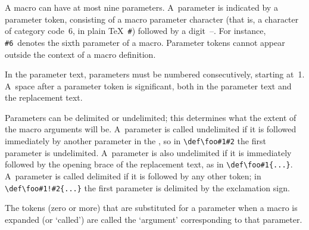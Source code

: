 A macro can have at most nine parameters. 
A~parameter is indicated by a parameter token,
consisting of a macro parameter character
(that is, a character of category code~6,
in plain \TeX~\verb=#=) 
followed by a digit~--. 
For instance, \verb>#6>~denotes the sixth parameter of a macro.
Parameter tokens cannot appear outside the context
of a macro definition.

In the parameter text,
parameters must be numbered consecutively, starting at~1.
A~space after a parameter token is significant,
both in the parameter text and the replacement text.

Parameters can be delimited or undelimited; this determines what the
extent of the macro arguments will be. A~parameter
is called undelimited if it is followed immediately
by another parameter in the , so in
\verb+\def\foo#1#2+ the first parameter is undelimited.
A~parameter is also undelimited if it is immediately followed
by the opening brace of the replacement text, as in \verb+\def\foo#1{...}+.
A~parameter is called delimited if it is followed by any other token; 
in \verb+\def\foo#1!#2{...}+ the first parameter is delimited by the
exclamation sign.

The tokens (zero or more) that are substituted for
a parameter when a macro is expanded (or `called')
are called
the `argument' corresponding to that parameter.

